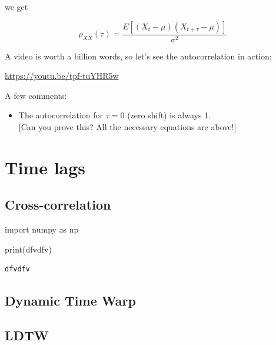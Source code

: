 \documentclass[
  letterpaper,
  DIV=11,
  numbers=noendperiod,
  oneside]{scrreprt}
\newenvironment{Shaded}{\begin{snugshade}}{\end{snugshade}}
\newcommand{\BuiltInTok}[1]{\textcolor[rgb]{0.00,0.23,0.31}{#1}}
\newcommand{\ImportTok}[1]{\textcolor[rgb]{0.00,0.46,0.62}{#1}}
\newcommand{\NormalTok}[1]{\textcolor[rgb]{0.00,0.23,0.31}{#1}}
\newcommand{\StringTok}[1]{\textcolor[rgb]{0.13,0.47,0.30}{#1}}
\providecommand{\tightlist}{%
  \setlength{\itemsep}{0pt}\setlength{\parskip}{0pt}}\usepackage{longtable,booktabs,array}
\begin{document}
we get

\[
\rho_{XX}(\tau) = \frac{E\left[ (X_t - \mu)(X_{t+\tau} - \mu) \right]}{\sigma^2}
\]

A video is worth a billion words, so let's see the autocorrelation in
action:

\url{https://youtu.be/tpf-tuYHR5w}

A few comments:

\begin{itemize}
\tightlist
\item
  The autocorrelation for \(\tau=0\) (zero shift) is always 1.\\
  {[}Can you prove this? All the necessary equations are above!{]}
\end{itemize}

\part{Time lags}

\hypertarget{cross-correlation}{%
\chapter{Cross-correlation}\label{cross-correlation}}

\begin{Shaded}
\begin{Highlighting}[]
\ImportTok{import}\NormalTok{ numpy }\ImportTok{as}\NormalTok{ np}
\end{Highlighting}
\end{Shaded}

\begin{Shaded}
\begin{Highlighting}[]
\BuiltInTok{print}\NormalTok{(}\StringTok{\textquotesingle{}dfvdfv\textquotesingle{}}\NormalTok{)}
\end{Highlighting}
\end{Shaded}

\begin{verbatim}
dfvdfv
\end{verbatim}

\hypertarget{dynamic-time-warp}{%
\chapter{Dynamic Time Warp}\label{dynamic-time-warp}}

\hypertarget{ldtw}{%
\chapter{LDTW}\label{ldtw}}
\end{document}
